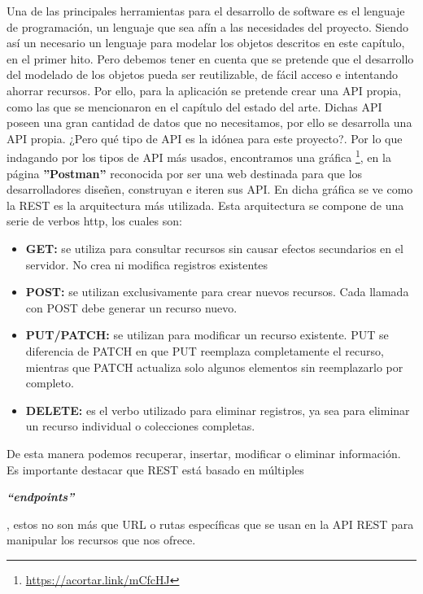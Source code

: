 Una de las principales herramientas para el desarrollo de software es el lenguaje de programación, un lenguaje que sea afín a las necesidades del proyecto. Siendo así un necesario un lenguaje para modelar los objetos descritos en este capítulo, en el primer hito. Pero debemos tener en cuenta que se pretende que el desarrollo del modelado de los objetos pueda ser reutilizable, de fácil acceso e intentando ahorrar recursos. Por ello, para la aplicación se pretende crear una API propia, como las que se mencionaron en el capítulo del estado del arte. Dichas API poseen una gran cantidad de datos que no necesitamos, por ello se desarrolla una API propia. ¿Pero qué tipo de API es la idónea para este proyecto?. Por lo que indagando por los tipos de API más usados, encontramos una gráfica \footnote{\url{https://acortar.link/mCfcHJ}}, en la página \textbf{''Postman''} reconocida por ser una web destinada para que los desarrolladores diseñen, construyan e iteren sus API. En dicha gráfica se ve como la REST es la arquitectura más utilizada. Esta arquitectura se compone de una serie de verbos http, los cuales son: 
\begin{itemize}
\item \textbf{GET:} se utiliza para consultar recursos sin causar efectos secundarios en el servidor. No crea ni modifica registros existentes
\item \textbf{POST:} se utilizan exclusivamente para crear nuevos recursos. Cada llamada con POST debe generar un recurso nuevo.
\item \textbf{PUT/PATCH:} se utilizan para modificar un recurso existente. PUT se diferencia de PATCH en que PUT reemplaza completamente el recurso, mientras que PATCH actualiza solo algunos elementos sin reemplazarlo por completo.
\item \textbf{DELETE:} es el verbo utilizado para eliminar registros, ya sea para eliminar un recurso individual o colecciones completas.
\end{itemize}

De esta manera podemos recuperar, insertar, modificar o eliminar información. Es importante destacar que REST está basado en múltiples \begin{otherlanguage}{english}\textit{\textbf{``endpoints''}}\end{otherlanguage}, estos no son más que URL o rutas específicas que se usan en la API REST para manipular los recursos que nos ofrece.

